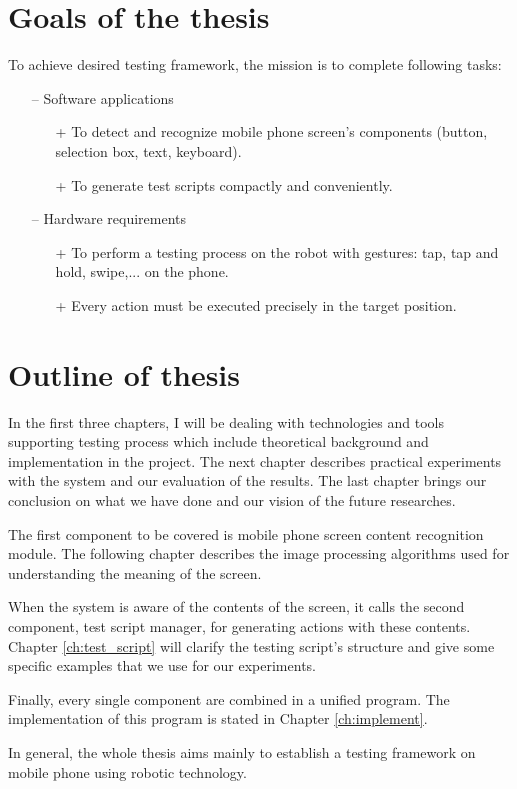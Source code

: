 \section{Goals of the thesis}
To achieve desired testing framework, the mission is to complete following tasks:
	\begin{itemize}
		\item[--] Software applications
        	\begin{itemize}
				\item[+] To detect and recognize mobile phone screen's components (button, selection box, text, keyboard).
				\item[+] To generate test scripts compactly and conveniently.
			\end{itemize}
		\item[--] Hardware requirements
        	\begin{itemize}
				\item[+] To perform a testing process on the robot with gestures: tap, tap and hold, swipe,... on the phone.
				\item[+] Every action must be executed precisely in the target position.
			\end{itemize}
	\end{itemize}

\section{Outline of thesis}
In the first three chapters, I will be dealing with technologies and tools supporting testing process which include theoretical background and implementation in the project. The next chapter describes practical experiments with the system and our evaluation of the results. The last chapter brings our conclusion on what we have done and our vision of the future researches.

The first component to be covered is mobile phone screen content recognition module. The following chapter describes the image processing algorithms used for understanding the meaning of the screen. 

When the system is aware of the contents of the screen, it calls the second component, test script manager, for generating actions with these contents. Chapter \ref{ch:test_script} will clarify the testing script's structure and give some specific examples that we use for our experiments.

Finally, every single component are combined in a unified program. The implementation of this program is stated in Chapter \ref{ch:implement}.

In general, the whole thesis aims mainly to establish a testing framework on mobile phone using robotic technology. \nocite{radim_thesis}
